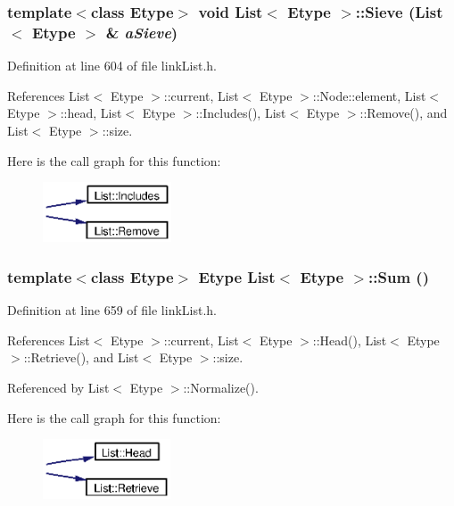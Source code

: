 \subsubsection{\setlength{\rightskip}{0pt plus 5cm}template$<$class Etype$>$ void {\bf List}$<$ Etype $>$::{\bf Sieve} ({\bf List}$<$ Etype $>$ \& {\em a\-Sieve})}\label{classList_a19}




Definition at line 604 of file link\-List.h.

References List$<$ Etype $>$::current, List$<$ Etype $>$::Node::element, List$<$ Etype $>$::head, List$<$ Etype $>$::Includes(), List$<$ Etype $>$::Remove(), and List$<$ Etype $>$::size.

Here is the call graph for this function:\begin{figure}[H]
\begin{center}
\leavevmode
\includegraphics[width=108pt]{classList_a19_cgraph}
\end{center}
\end{figure}
\subsubsection{\setlength{\rightskip}{0pt plus 5cm}template$<$class Etype$>$ Etype {\bf List}$<$ Etype $>$::Sum ()}\label{classList_a21}




Definition at line 659 of file link\-List.h.

References List$<$ Etype $>$::current, List$<$ Etype $>$::Head(), List$<$ Etype $>$::Retrieve(), and List$<$ Etype $>$::size.

Referenced by List$<$ Etype $>$::Normalize().

Here is the call graph for this function:\begin{figure}[H]
\begin{center}
\leavevmode
\includegraphics[width=107pt]{classList_a21_cgraph}
\end{center}
\end{figure}
